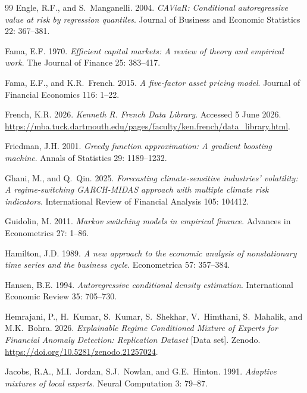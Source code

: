 \documentclass[]{interact}
\begin{document}
\begin{thebibliography}{99}
Engle, R.F., and S.~Manganelli. 2004. \emph{CAViaR: Conditional autoregressive value at risk by regression quantiles}. Journal of Business and Economic Statistics 22: 367--381.

Fama, E.F. 1970. \emph{Efficient capital markets: A review of theory and empirical work}. The Journal of Finance 25: 383--417.

Fama, E.F., and K.R.~French. 2015. \emph{A five-factor asset pricing model}. Journal of Financial Economics 116: 1--22.

French, K.R. 2026. \emph{Kenneth R. French Data Library}. Accessed 5 June 2026. \url{https://mba.tuck.dartmouth.edu/pages/faculty/ken.french/data_library.html}.

Friedman, J.H. 2001. \emph{Greedy function approximation: A gradient boosting machine}. Annals of Statistics 29: 1189--1232.

Ghani, M., and Q.~Qin. 2025. \emph{Forecasting climate-sensitive industries' volatility: A regime-switching GARCH-MIDAS approach with multiple climate risk indicators}. International Review of Financial Analysis 105: 104412. 

Guidolin, M. 2011. \emph{Markov switching models in empirical finance}. Advances in Econometrics 27: 1--86.

Hamilton, J.D. 1989. \emph{A new approach to the economic analysis of nonstationary time series and the business cycle}. Econometrica 57: 357--384.

Hansen, B.E. 1994. \emph{Autoregressive conditional density estimation}. International Economic Review 35: 705--730.

Hemrajani, P., H.~Kumar, S.~Kumar, S.~Shekhar, V.~Himthani, S.~Mahalik, and M.K.~Bohra. 2026. \emph{Explainable Regime Conditioned Mixture of Experts for Financial Anomaly Detection: Replication Dataset} [Data set]. Zenodo. \url{https://doi.org/10.5281/zenodo.21257024}.

Jacobs, R.A., M.I.~Jordan, S.J.~Nowlan, and G.E.~Hinton. 1991. \emph{Adaptive mixtures of local experts}. Neural Computation 3: 79--87.


\end{thebibliography}
\end{document}
